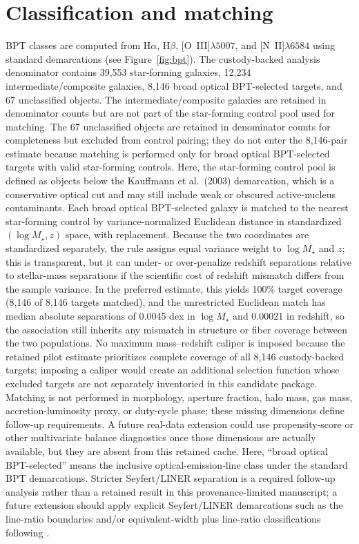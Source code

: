 \documentclass[twocolumn]{aastex631}
\begin{document}
\section{Classification and matching}
BPT classes are computed from H$\alpha$, H$\beta$, [O~III]$\lambda5007$, and [N~II]$\lambda6584$ using standard demarcations \citep{baldwin1981,kewley2001,kauffmann2003bpt,kewley2006} (see Figure~\ref{fig:bpt}). The custody-backed analysis denominator contains 39,553 star-forming galaxies, 12,234 intermediate/composite galaxies, 8,146 broad optical BPT-selected targets, and 67 unclassified objects. The intermediate/composite galaxies are retained in denominator counts but are not part of the star-forming control pool used for matching. The 67 unclassified objects are retained in denominator counts for completeness but excluded from control pairing; they do not enter the 8,146-pair estimate because matching is performed only for broad optical BPT-selected targets with valid star-forming controls. Here, the star-forming control pool is defined as objects below the Kauffmann et al.\ (2003) demarcation, which is a conservative optical cut and may still include weak or obscured active-nucleus contaminants. Each broad optical BPT-selected galaxy is matched to the nearest star-forming control by variance-normalized Euclidean distance in standardized $(\log M_\star,z)$ space, with replacement. Because the two coordinates are standardized separately, the rule assigns equal variance weight to $\log M_\star$ and \(z\); this is transparent, but it can under- or over-penalize redshift separations relative to stellar-mass separations if the scientific cost of redshift mismatch differs from the sample variance. In the preferred estimate, this yields 100\% target coverage (8,146 of 8,146 targets matched), and the unrestricted Euclidean match has median absolute separations of 0.0045 dex in $\log M_\star$ and 0.00021 in redshift, so the association still inherits any mismatch in structure or fiber coverage between the two populations. No maximum mass--redshift caliper is imposed because the retained pilot estimate prioritizes complete coverage of all 8,146 custody-backed targets; imposing a caliper would create an additional selection function whose excluded targets are not separately inventoried in this candidate package. Matching is not performed in morphology, aperture fraction, halo mass, gas mass, accretion-luminosity proxy, or duty-cycle phase; these missing dimensions define follow-up requirements. A future real-data extension could use propensity-score or other multivariate balance diagnostics once those dimensions are actually available, but they are absent from this retained cache.
Here, ``broad optical BPT-selected'' means the inclusive optical-emission-line class under the standard BPT demarcations. Stricter Seyfert/LINER separation is a required follow-up analysis rather than a retained result in this provenance-limited manuscript; a future extension should apply explicit Seyfert/LINER demarcations such as the \citet{kewley2006} line-ratio boundaries and/or equivalent-width plus line-ratio classifications following \citet{cidfernandes2010}.
\end{document}
